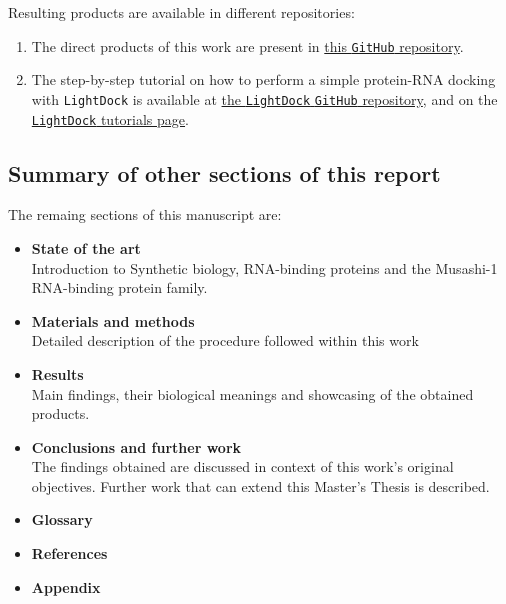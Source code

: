 Resulting products are available in different repositories:
\begin{enumerate}
    \item The direct products of this work are present in \href{https://github.com/luksgrin/UOC_TFM}{this \texttt{GitHub} repository}.
    \item The step-by-step tutorial on how to perform a simple protein-RNA docking with \texttt{LightDock} is available at \href{https://github.com/lightdock/lightdock.github.io}{the \texttt{LightDock} \texttt{GitHub} repository}, and on the \href{https://lightdock.org/tutorials/}{\texttt{LightDock} tutorials page}.
\end{enumerate}

\subsection{Summary of other sections of this report}


The remaing sections of this manuscript are:

\begin{itemize}
    \item\textbf{State of the art}\\
        Introduction to Synthetic biology, RNA-binding proteins and the Musashi-1 RNA-binding protein family.
    \item\textbf{Materials and methods}\\
        Detailed description of the procedure followed within this work
    \item\textbf{Results}\\
        Main findings, their biological meanings and showcasing of the obtained products.
    \item\textbf{Conclusions and further work}\\
        The findings obtained are discussed in context of this work's original objectives. Further work that can extend this Master's Thesis is described.
    \item\textbf{Glossary}
    \item\textbf{References}
    \item\textbf{Appendix}
\end{itemize}